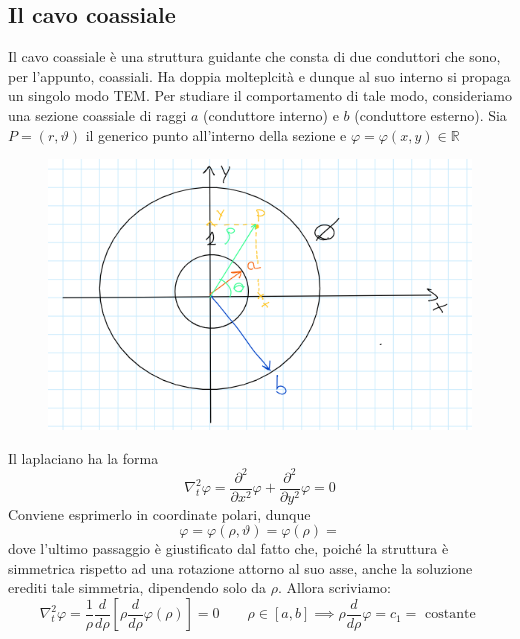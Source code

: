 \documentclass{book}
\begin{document}
        \subsection{Il cavo coassiale}
        Il cavo coassiale è una struttura guidante che consta di due conduttori che sono, per l'appunto, coassiali. Ha doppia molteplcità e dunque al suo interno si 
        propaga un singolo modo TEM. Per studiare il comportamento di tale modo, consideriamo una sezione coassiale di raggi $a$ (conduttore interno) e $b$ (conduttore esterno). Sia $P = (r, \vartheta)$ il 
        generico punto all'interno della sezione e $\varphi = \varphi(x,y) \in \mathbb{R}$
        \begin{figure}[h!]
            \center  
            \includegraphics[width=0.7\linewidth]{img/Chapter_three/Chapt3img9.png}
        \end{figure}
        Il laplaciano ha la forma
        \begin{equation}
            \nabla_{t} ^{2} \varphi = \frac{\partial ^{2}}{ \partial x^{2}}\varphi + \frac{\partial ^{2}}{\partial y ^{2}}\varphi = 0
        \end{equation}
        Conviene esprimerlo in coordinate polari, dunque
        \begin{equation}
            \varphi = \varphi(\rho, \vartheta) = \varphi(\rho) = 
        \end{equation}
        dove l'ultimo passaggio è giustificato dal fatto che, poiché la struttura è simmetrica rispetto ad una rotazione attorno al suo asse, anche la soluzione erediti tale simmetria, dipendendo 
        solo da $\rho$. Allora scriviamo:
        \begin{equation}
            \nabla_{t} ^{2} \varphi = \frac{1}{\rho} \frac{d}{d\rho} [\rho \frac{d}{d \rho} \varphi(\rho)] = 0 \qquad \rho \in [a, b] \implies \rho \frac{d}{d \rho} \varphi = c_{1} = \textrm{ costante }
        \end{equation}
\end{document}
